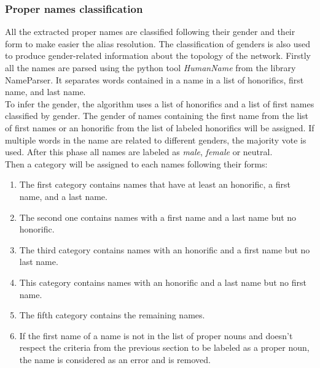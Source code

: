 \documentclass[a4paper, 12pt]{report}
\begin{document}
\subsubsection{Proper names classification}
\label{section:classification}
All the extracted proper names are classified following their gender and their form to make easier the alias resolution.
The classification of genders is also used to produce gender-related information about the topology of the network.
Firstly all the names are parsed using the python tool \textit{HumanName} from the library {NameParser}.
It separates words contained in a name in a list of honorifics, first name, and last name.\\

To infer the gender, the algorithm uses a list of honorifics and a list of first names classified by gender.
The gender of names containing the first name from the list of first names or an honorific from the list of labeled honorifics will be assigned.
If multiple words in the name are related to different genders, the majority vote is used.
After this phase all names are labeled as \textit{male}, \textit{female} or {neutral}.\\

Then a category will be assigned to each names following their forms:
\begin{enumerate}
\item The first category contains names that have at least an honorific, a first name, and a last name.
\item The second one contains names with a first name and a last name but no honorific.
\item The third category contains names with an honorific and a first name but no last name.
\item This category contains names with an honorific and a last name but no first name.
\item The fifth category contains the remaining names.
\item If the first name of a name is not in the list of proper nouns and doesn't respect the criteria from the previous section to be labeled as a proper noun,
the name is considered as an error and is removed.
\end{enumerate}
\end{document}
